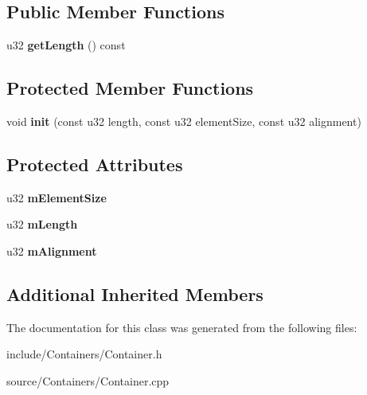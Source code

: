 \subsection*{Public Member Functions}
\begin{DoxyCompactItemize}
\item 
u32 {\bfseries get\+Length} () const \hypertarget{classDE_1_1Container_ac4e1b4aefaecda0e225312fe463c9995}{}\label{classDE_1_1Container_ac4e1b4aefaecda0e225312fe463c9995}

\end{DoxyCompactItemize}
\subsection*{Protected Member Functions}
\begin{DoxyCompactItemize}
\item 
void {\bfseries init} (const u32 length, const u32 element\+Size, const u32 alignment)\hypertarget{classDE_1_1Container_a449de30288ea53726ece6268becc9d86}{}\label{classDE_1_1Container_a449de30288ea53726ece6268becc9d86}

\end{DoxyCompactItemize}
\subsection*{Protected Attributes}
\begin{DoxyCompactItemize}
\item 
u32 {\bfseries m\+Element\+Size}\hypertarget{classDE_1_1Container_aa644444a2ab6f47a2f23a24fc3735022}{}\label{classDE_1_1Container_aa644444a2ab6f47a2f23a24fc3735022}

\item 
u32 {\bfseries m\+Length}\hypertarget{classDE_1_1Container_acde96d5b0bd1bd51c64b762b77b81fbb}{}\label{classDE_1_1Container_acde96d5b0bd1bd51c64b762b77b81fbb}

\item 
u32 {\bfseries m\+Alignment}\hypertarget{classDE_1_1Container_af34003e0c91ad31e4d744d3b9f4bb7c1}{}\label{classDE_1_1Container_af34003e0c91ad31e4d744d3b9f4bb7c1}

\end{DoxyCompactItemize}
\subsection*{Additional Inherited Members}


The documentation for this class was generated from the following files\+:\begin{DoxyCompactItemize}
\item 
include/\+Containers/Container.\+h\item 
source/\+Containers/Container.\+cpp\end{DoxyCompactItemize}
